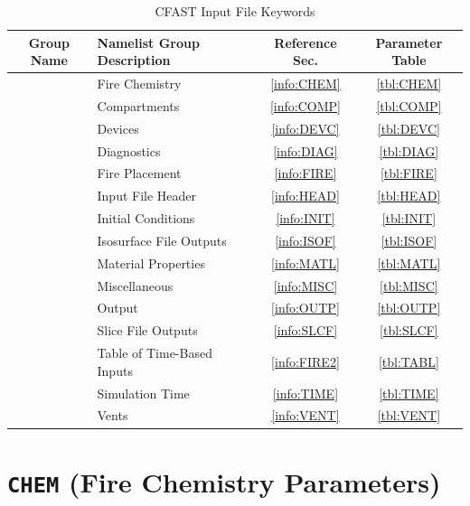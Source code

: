 \begin{table}[ht]
\begin{center}
\caption{CFAST Input File Keywords}
\label{tbl:namelistgroups}
\begin{tabular}{|c|l|c|c|}
\hline
Group Name & Namelist Group Description  & Reference Sec.    & Parameter Table \\ \hline
\ct{CHEM}  & Fire Chemistry              & \ref{info:CHEM}   & \ref{tbl:CHEM}  \\ \hline
\ct{COMP}  & Compartments                & \ref{info:COMP}   & \ref{tbl:COMP}  \\ \hline
\ct{DEVC}  & Devices                     & \ref{info:DEVC}   & \ref{tbl:DEVC}  \\ \hline
\ct{DIAG}  & Diagnostics                 & \ref{info:DIAG}   & \ref{tbl:DIAG}  \\ \hline
\ct{FIRE}  & Fire Placement              & \ref{info:FIRE}   & \ref{tbl:FIRE} \\ \hline
\ct{HEAD}  & Input File Header           & \ref{info:HEAD}   & \ref{tbl:HEAD}  \\ \hline
\ct{INIT}  & Initial Conditions          & \ref{info:INIT}   & \ref{tbl:INIT}  \\ \hline
\ct{ISOF}  & Isosurface File Outputs     & \ref{info:ISOF}   & \ref{tbl:ISOF}  \\ \hline
\ct{MATL}  & Material Properties         & \ref{info:MATL}   & \ref{tbl:MATL}  \\ \hline
\ct{MISC}  & Miscellaneous               & \ref{info:MISC}   & \ref{tbl:MISC}  \\ \hline
\ct{OUTP}  & Output                      & \ref{info:OUTP}   & \ref{tbl:OUTP}  \\ \hline
\ct{SLCF}  & Slice File Outputs          & \ref{info:SLCF}   & \ref{tbl:SLCF}  \\ \hline
\ct{TABL}  & Table of Time-Based Inputs  & \ref{info:FIRE2}  & \ref{tbl:TABL} \\ \hline
\ct{TIME}  & Simulation Time             & \ref{info:TIME}   & \ref{tbl:TIME}  \\ \hline
\ct{VENT}  & Vents                       & \ref{info:VENT}   & \ref{tbl:VENT}  \\ \hline
\end{tabular}
\end{center}
\end{table}


\section{\texorpdfstring{{\tt CHEM}}{CHEM} (Fire Chemistry Parameters)}
\label{app:namelist_chem}

